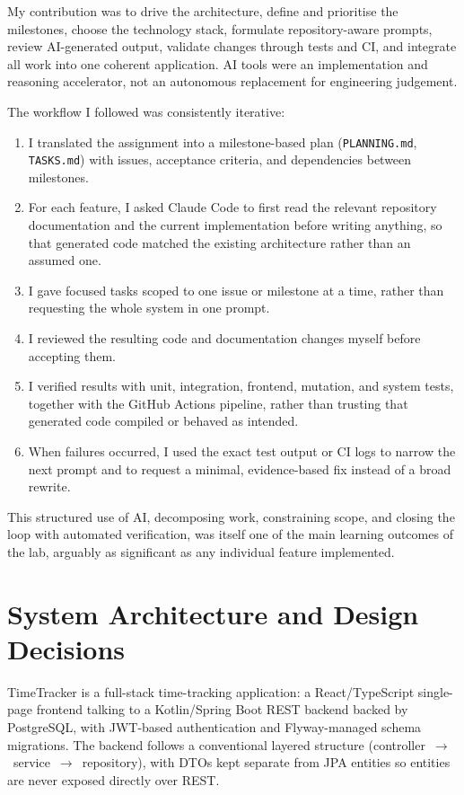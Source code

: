 \documentclass[11pt,a4paper]{article}
\begin{document}
My contribution was to drive the architecture, define and prioritise the milestones, choose the technology stack, formulate repository-aware prompts, review AI-generated output, validate changes through tests and CI, and integrate all work into one coherent application. AI tools were an implementation and reasoning accelerator, not an autonomous replacement for engineering judgement.

The workflow I followed was consistently iterative:

\begin{enumerate}
    \item I translated the assignment into a milestone-based plan (\texttt{PLANNING.md}, \texttt{TASKS.md}) with issues, acceptance criteria, and dependencies between milestones.
    \item For each feature, I asked Claude Code to first read the relevant repository documentation and the current implementation before writing anything, so that generated code matched the existing architecture rather than an assumed one.
    \item I gave focused tasks scoped to one issue or milestone at a time, rather than requesting the whole system in one prompt.
    \item I reviewed the resulting code and documentation changes myself before accepting them.
    \item I verified results with unit, integration, frontend, mutation, and system tests, together with the GitHub Actions pipeline, rather than trusting that generated code compiled or behaved as intended.
    \item When failures occurred, I used the exact test output or CI logs to narrow the next prompt and to request a minimal, evidence-based fix instead of a broad rewrite.
\end{enumerate}

This structured use of AI, decomposing work, constraining scope, and closing the loop with automated verification, was itself one of the main learning outcomes of the lab, arguably as significant as any individual feature implemented.

\newpage
\section{System Architecture and Design Decisions}

TimeTracker is a full-stack time-tracking application: a React/TypeScript single-page frontend talking to a Kotlin/Spring Boot REST backend backed by PostgreSQL, with JWT-based authentication and Flyway-managed schema migrations. The backend follows a conventional layered structure (controller~$\to$~service~$\to$~repository), with DTOs kept separate from JPA entities so entities are never exposed directly over REST.
\end{document}
